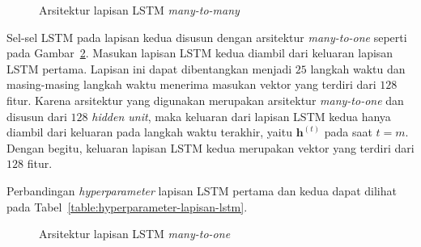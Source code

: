 \begin{figure}[h!]
    \centering
    \caption{Arsitektur lapisan LSTM \textit{many-to-many}}
    \label{gambar:many-to-many}
\end{figure}

Sel-sel LSTM pada lapisan kedua disusun dengan arsitektur \textit{many-to-one} seperti pada Gambar~\ref{gambar:many-to-one}. Masukan lapisan LSTM kedua diambil dari keluaran lapisan LSTM pertama. Lapisan ini dapat dibentangkan menjadi $25$ langkah waktu dan masing-masing langkah waktu menerima masukan vektor yang terdiri dari $128$ fitur. Karena arsitektur yang digunakan merupakan arsitektur \textit{many-to-one} dan disusun dari $128$ \textit{hidden unit}, maka keluaran dari lapisan LSTM kedua hanya diambil dari keluaran pada langkah waktu terakhir, yaitu $\pmb{h}^{(t)}$ pada saat $t = m$. Dengan begitu, keluaran lapisan LSTM kedua merupakan vektor yang terdiri dari $128$ fitur.

Perbandingan \textit{hyperparameter} lapisan LSTM pertama dan kedua dapat dilihat pada Tabel~\ref{table:hyperparameter-lapisan-lstm}.

\begin{figure}[h!]
    \centering
    \caption{Arsitektur lapisan LSTM \textit{many-to-one}}
    \label{gambar:many-to-one}
\end{figure}

